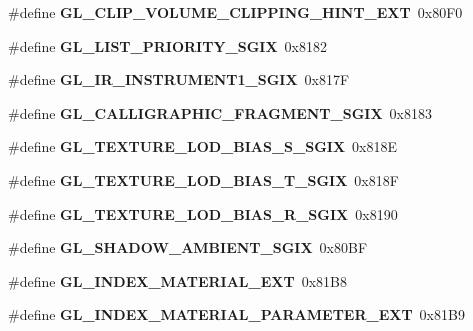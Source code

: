 \begin{DoxyCompactItemize}
\item 
\#define {\bfseries G\+L\+\_\+\+C\+L\+I\+P\+\_\+\+V\+O\+L\+U\+M\+E\+\_\+\+C\+L\+I\+P\+P\+I\+N\+G\+\_\+\+H\+I\+N\+T\+\_\+\+E\+X\+T}~0x80\+F0\label{_s_d_l__opengl_8h_a1fff75c0542989ebe40b2abe80648743}

\item 
\#define {\bfseries G\+L\+\_\+\+L\+I\+S\+T\+\_\+\+P\+R\+I\+O\+R\+I\+T\+Y\+\_\+\+S\+G\+I\+X}~0x8182\label{_s_d_l__opengl_8h_a8341b5128ddba62d73e46d33e9e486db}

\item 
\#define {\bfseries G\+L\+\_\+\+I\+R\+\_\+\+I\+N\+S\+T\+R\+U\+M\+E\+N\+T1\+\_\+\+S\+G\+I\+X}~0x817\+F\label{_s_d_l__opengl_8h_a9c98811c3373380e0be6657701310528}

\item 
\#define {\bfseries G\+L\+\_\+\+C\+A\+L\+L\+I\+G\+R\+A\+P\+H\+I\+C\+\_\+\+F\+R\+A\+G\+M\+E\+N\+T\+\_\+\+S\+G\+I\+X}~0x8183\label{_s_d_l__opengl_8h_a4dae47be45a802d3b9d61febe0663798}

\item 
\#define {\bfseries G\+L\+\_\+\+T\+E\+X\+T\+U\+R\+E\+\_\+\+L\+O\+D\+\_\+\+B\+I\+A\+S\+\_\+\+S\+\_\+\+S\+G\+I\+X}~0x818\+E\label{_s_d_l__opengl_8h_a633117773eb3ec25ac37a6cef26111ff}

\item 
\#define {\bfseries G\+L\+\_\+\+T\+E\+X\+T\+U\+R\+E\+\_\+\+L\+O\+D\+\_\+\+B\+I\+A\+S\+\_\+\+T\+\_\+\+S\+G\+I\+X}~0x818\+F\label{_s_d_l__opengl_8h_a21f994d255480fb301d22d8fc55dc051}

\item 
\#define {\bfseries G\+L\+\_\+\+T\+E\+X\+T\+U\+R\+E\+\_\+\+L\+O\+D\+\_\+\+B\+I\+A\+S\+\_\+\+R\+\_\+\+S\+G\+I\+X}~0x8190\label{_s_d_l__opengl_8h_afc2386b83aa1de15081dd3d33260316d}

\item 
\#define {\bfseries G\+L\+\_\+\+S\+H\+A\+D\+O\+W\+\_\+\+A\+M\+B\+I\+E\+N\+T\+\_\+\+S\+G\+I\+X}~0x80\+B\+F\label{_s_d_l__opengl_8h_a400a75350f09c742a62f776b511e74ae}

\item 
\#define {\bfseries G\+L\+\_\+\+I\+N\+D\+E\+X\+\_\+\+M\+A\+T\+E\+R\+I\+A\+L\+\_\+\+E\+X\+T}~0x81\+B8\label{_s_d_l__opengl_8h_a4fd373ccfb9a34547c50e932699d3854}

\item 
\#define {\bfseries G\+L\+\_\+\+I\+N\+D\+E\+X\+\_\+\+M\+A\+T\+E\+R\+I\+A\+L\+\_\+\+P\+A\+R\+A\+M\+E\+T\+E\+R\+\_\+\+E\+X\+T}~0x81\+B9\label{_s_d_l__opengl_8h_adf0b5a0deef0348394f36e5a35ae173d}


\end{DoxyCompactItemize}
